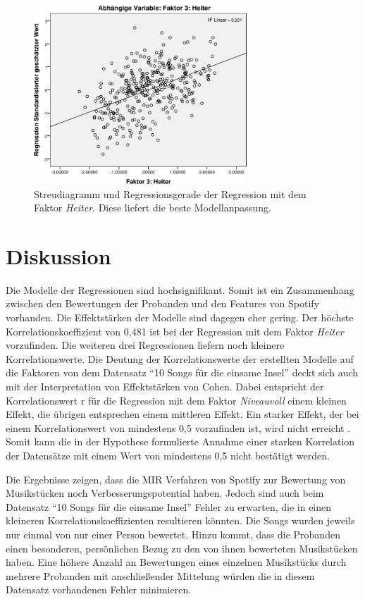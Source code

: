 \begin{figure}[hbt]
    \begin{center}
        \includegraphics[width=8cm]{images/StreudiagrammFak3.pdf}
    \end{center}
    \caption{Streudiagramm und Regressionsgerade der Regression mit dem Faktor \textit{Heiter}. Diese liefert die beste Modellanpassung.}
    \label{fig:Faktor3}
\end{figure}

\section*{Diskussion}
\label{sec:Diskussion}


Die Modelle der Regressionen sind hochsignifikant.
Somit ist ein Zusammenhang zwischen den Bewertungen der Probanden und den Features von Spotify vorhanden.
Die Effektstärken der Modelle sind dagegen eher gering. 
Der höchste Korrelationskoeffizient von 0,481 ist bei der Regression mit dem Faktor \textit{Heiter} vorzufinden. Die weiteren drei Regressionen liefern noch kleinere Korrelationswerte.
Die Deutung der Korrelationswerte der erstellten Modelle auf die Faktoren von dem Datensatz "`10 Songs für die einsame Insel"' deckt sich auch mit der Interpretation von Effektstärken von Cohen.
Dabei entspricht der Korrelationswert r für die Regression mit dem Faktor \textit{Niveauvoll} einem kleinen Effekt, die übrigen entsprechen einem mittleren Effekt. 
Ein starker Effekt, der bei einem Korrelationswert von mindestens 0,5 vorzufinden ist, wird nicht erreicht \cite{cohen1988}.
Somit kann die in der Hypothese formulierte Annahme einer starken Korrelation der Datensätze mit einem Wert von mindestens 0,5 nicht bestätigt werden. 

Die Ergebnisse zeigen, dass die MIR Verfahren von Spotify zur Bewertung von Musikstücken noch Verbesserungspotential haben.
Jedoch sind auch beim Datensatz "`10 Songs für die einsame Insel"' Fehler zu erwarten, die in einen kleineren Korrelationskoeffizienten resultieren könnten.
Die Songs wurden jeweils nur einmal von nur einer Person bewertet.
Hinzu kommt, dass die Probanden einen besonderen, persönlichen Bezug zu den von ihnen bewerteten Musikstücken haben.
Eine höhere Anzahl an Bewertungen eines einzelnen Musikstücks durch mehrere Probanden mit anschließender Mittelung würden die in diesem Datensatz vorhandenen Fehler minimieren.

